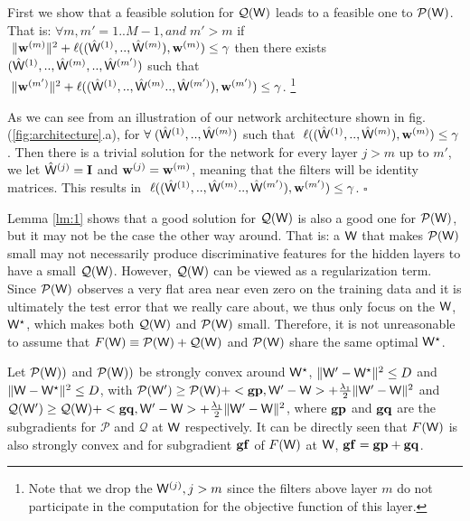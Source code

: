 \documentclass{article} %
\newcommand{\cW}{{\bf \mathsf{W}}}
\newcommand{\sw}{{\bf w}}
\newcommand{\sL}{\ell}
\newcommand{\aP}{{\mathcal{P}}}
\newcommand{\aQ}{{\mathcal{Q}}}
\newcommand{\gp}{{\bf gp}}
\newcommand{\gq}{{\bf gq}}
\newcommand{\gf}{{\bf gf}}
\newenvironment{proof}[1][Proof]{\begin{trivlist}
\item[\hskip \labelsep {\bfseries #1}]}{\end{trivlist}}
\newenvironment{remark}[1][Remark]{\begin{trivlist}
\item[\hskip \labelsep {\bfseries #1}]}{\end{trivlist}}
\begin{document}
First we show that a feasible solution for $\aQ(\cW)$ leads to a feasible one to $\aP(\cW)$. That is:
{\lemma \label{lm:1} $\forall m,m'=1..M-1, and \; m' > m$ \;
if $\; \lVert \sw^{(m)} \rVert^2+ \sL((\hat{\cW}^{(1)},..,\hat{\cW}^{(m)}), \sw^{(m)}) \le \gamma$ then there exists $(\hat{\cW}^{(1)},..,\hat{\cW}^{(m)},..,\hat{\cW}^{(m')})$ such that 
$\; \lVert \sw^{(m')} \rVert^2 + \sL((\hat{\cW}^{(1)},..,\hat{\cW}^{(m)}..,\hat{\cW}^{(m')}), \sw^{(m')}) \le \gamma$. \footnote{Note that we drop the $\cW^{(j)}, j>m$ since the filters above layer $m$ do not participate in the computation for the objective function of this layer.}
}
\begin{proof}

As we can see from an illustration of our network architecture shown in fig. (\ref{fig:architecture}.a), for $\forall \;(\hat{\cW}^{(1)},..,\hat{\cW}^{(m)})$ such that $\; \sL((\hat{\cW}^{(1)},..,\hat{\cW}^{(m)}), \sw^{(m)}) \le \gamma$. Then there is a trivial solution for the network for every layer $j>m$ up to $m'$, we let $\hat{\cW}^{(j)} = \mathbf{I}$ and $\sw^{(j)}=\sw^{(m)}$, meaning that the filters will be identity matrices. This results in $\; \sL((\hat{\cW}^{(1)},..,\hat{\cW}^{(m)}..,\hat{\cW}^{(m')}), \sw^{(m')}) \le \gamma$.  \hfill $\square$
\end{proof}

\begin{remark} Lemma \ref{lm:1} shows that a good solution for $\aQ(\cW)$ is also a good one for $\aP(\cW)$, but it may not be the case the other way around. That is: a $\cW$ that makes $\aP(\cW)$ small may not necessarily produce discriminative features for the hidden layers to have a small
$\aQ(\cW)$. However, $\aQ(\cW)$ can be viewed as a regularization term. Since $\aP(\cW)$ observes a very flat area near even zero on the training data and it is ultimately the test error that we really care about, we thus only focus on the $\cW$, $\cW^{\star}$, which makes both $\aQ(\cW)$ and $\aP(\cW)$ small. Therefore, it is not unreasonable to assume that $F(\cW)\equiv \aP(\cW) + \aQ(\cW)$ and $\aP(\cW)$ share the same optimal $\cW^{\star}$. 

 Let $\aP(\cW))$ and $\aP(\cW))$ be strongly convex around $\cW^{\star}$, $\lVert\cW'- \cW^{\star}\rVert^2 \le D$ and $\lVert\cW- \cW^{\star}\rVert^2 \le D$, with $\aP(\cW') \ge \aP(\cW) + <\gp, \cW'-\cW> + \frac{\lambda_1}{2} \lVert \cW'-\cW \rVert^2$ and $\aQ(\cW') \ge \aQ(\cW) + <\gq, \cW'-\cW> + \frac{\lambda_1}{2} \lVert \cW'-\cW \rVert^2$, where $\gp$  and $\gq$ are the subgradients for $\aP$ and $\aQ$ at $\cW$ respectively. It can be directly seen that $F(\cW)$ is also strongly convex and for subgradient $\gf$ of $F(\cW)$ at $\cW$, $\gf = \gp + \gq$.  
\end{remark}
\end{document}
